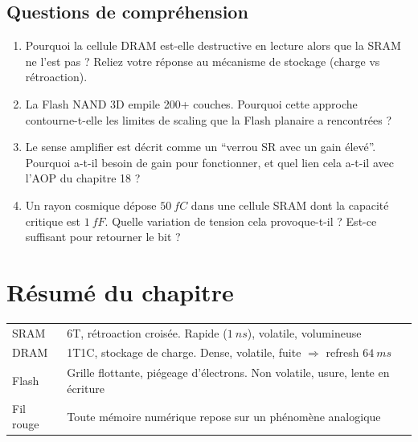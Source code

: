 \documentclass[12pt,a4paper,twoside]{book}
\begin{document}
\subsection*{Questions de compréhension}

\begin{enumerate}[nosep]
\item Pourquoi la cellule DRAM est-elle destructive en lecture alors que la SRAM ne l'est pas ? Reliez votre réponse au mécanisme de stockage (charge vs rétroaction).
\item La Flash NAND 3D empile 200+ couches. Pourquoi cette approche contourne-t-elle les limites de scaling que la Flash planaire a rencontrées ?
\item Le sense amplifier est décrit comme un ``verrou SR avec un gain élevé''. Pourquoi a-t-il besoin de gain pour fonctionner, et quel lien cela a-t-il avec l'AOP du chapitre 18 ?
\item Un rayon cosmique dépose $\SI{50}{fC}$ dans une cellule SRAM dont la capacité critique est $\SI{1}{fF}$. Quelle variation de tension cela provoque-t-il ? Est-ce suffisant pour retourner le bit ?
\end{enumerate}

\section*{Résumé du chapitre}

\begin{bases}[title={\color{white} Résumé --- Les Bases}]
\begin{center}
\renewcommand{\arraystretch}{1.3}
\begin{tabular}{p{3.5cm}p{9.5cm}}
\toprule
SRAM & 6T, rétroaction croisée. Rapide ($\SI{1}{ns}$), volatile, volumineuse \\
DRAM & 1T1C, stockage de charge. Dense, volatile, fuite $\Rightarrow$ refresh $\SI{64}{ms}$ \\
Flash & Grille flottante, piégeage d'électrons. Non volatile, usure, lente en écriture \\
Fil rouge & Toute mémoire numérique repose sur un phénomène analogique \\
\bottomrule
\end{tabular}
\end{center}
\end{bases}
\end{document}
